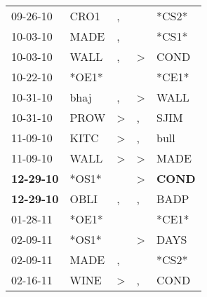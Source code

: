 \begin{supertabular}{p{0.07\textwidth}p{0.06\textwidth}p{0.02\textwidth}p{0.02\textwidth}p{0.06\textwidth}}
          09-26-10\textsuperscript{} &           CRO1\textsuperscript{} &                , &                  &                            *CS2* \\
          10-03-10\textsuperscript{} &           MADE\textsuperscript{} &                , &                  &                            *CS1* \\
          10-03-10\textsuperscript{} &           WALL\textsuperscript{} &                , &     \textgreater &           COND\textsuperscript{} \\
          10-22-10\textsuperscript{} &                            *OE1* &                  &                  &                            *CE1* \\
          10-31-10\textsuperscript{} &           bhaj\textsuperscript{} &                , &     \textgreater &           WALL\textsuperscript{} \\
          10-31-10\textsuperscript{} &           PROW\textsuperscript{} &     \textgreater &                , &           SJIM\textsuperscript{} \\
          11-09-10\textsuperscript{} &           KITC\textsuperscript{} &     \textgreater &                , &           bull\textsuperscript{} \\
          11-09-10\textsuperscript{} &           WALL\textsuperscript{} &     \textgreater &     \textgreater &           MADE\textsuperscript{} \\
 \textbf{12-29-10\textsuperscript{}} &                            *OS1* &                  &     \textgreater &  \textbf{COND\textsuperscript{}} \\
 \textbf{12-29-10\textsuperscript{}} &           OBLI\textsuperscript{} &                , &                , &           BADP\textsuperscript{} \\
          01-28-11\textsuperscript{} &                            *OE1* &                  &                  &                            *CE1* \\
          02-09-11\textsuperscript{} &                            *OS1* &                  &     \textgreater &           DAYS\textsuperscript{} \\
          02-09-11\textsuperscript{} &           MADE\textsuperscript{} &                , &                  &                            *CS2* \\
          02-16-11\textsuperscript{} &           WINE\textsuperscript{} &     \textgreater &                , &           COND\textsuperscript{} \\

\end{supertabular}
